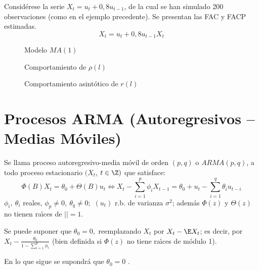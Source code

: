 \begin{ejemplo}
Consid\'{e}rese la serie $X_{t}=u_{t}+0,8u_{t-1}$, de 
la cual se han simulado 200 observaciones (como en el ejemplo precedente). 
Se presentan las FAC y FACP estimadas. 
\[
X_{t}=u_{t}+0,8u_{t-1}
X_{t}
\]

\begin{figure}[H]
\centering
\caption{Modelo $ MA(1)$}
\end{figure}

\begin{figure}[H]
\centering
\caption{Comportamiento de $\rho (l)$}
\end{figure}


\begin{figure}[H]
\centering
\caption{Comportamiento asint\'{o}tico de $r(l)$}
\end{figure}

\end{ejemplo}


\section{Procesos ARMA (Autoregresivos -- Medias M\'{o}viles)}

\begin{definicion}
 Se llama proceso 
autoregresivo-media m\'{o}vil de orden $(p,q)$ o $ARMA (p,q)$,  a todo proceso estacionario $(X_{{t}}$, $t\in 
\Z)$ que satisface:
\[
\Phi (B)X_{t} =\theta_{0} +\Theta \left( B \right)u_{t} \Longleftrightarrow 
X_{t} -\sum_{i=1}^p {\phi_{i} X_{t-1} =\theta_{0} +u_{t} 
-\sum_{i=1}^q {\theta_{i} u_{t-i} } } 
\]
$\phi_{i} ,\ \theta_{i} $ reales, $\phi_{p} \ne 0,\ \theta_{q} \ne 0;$ 
$(u_{{t}})$ r.b. de varianza $\sigma^{2}$; adem\'{a}s $\Phi 
(z)$ y $\Theta (z)$ no tienen ra\'{\i}ces de $\left| \right|=1$.
\end{definicion}

\begin{observacion}
 Se puede suponer que $\theta_{0} =0,$ 
reemplazando $X_{{t}}$ por $X_{{t }}-\E X_{{t}}$; es decir, por $X_{t} -\frac{\theta_{0} }{1-\sum_{i=1}^p {\phi_{i} } }$ (bien definida si $\Phi  (z)$ no 
tiene ra\'{\i}ces de m\'{o}dulo 1).
\end{observacion}

En lo que sigue se supondr\'{a} que $\theta_{0} =0$ .


